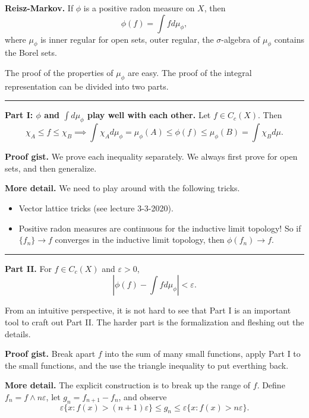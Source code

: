 \documentclass[12pt, letterpaper]{article}
\newcommand{\e}{\varepsilon}
\newcommand{\s}{\sigma}
\begin{document}
\pagestyle{fancy}
\textbf{Reisz-Markov.} If $\phi$ is a positive radon measure on $X$, then
\[
    \phi(f) = \int f d\mu_\phi,
\]
where $\mu_\phi$ is inner regular for open sets, outer regular, the $\s$-algebra of $\mu_\phi$ contains the Borel sets.

The proof of the properties of $\mu_\phi$ are easy. The proof of the integral representation can be divided into two parts.

\noindent\rule{\textwidth}{1pt}
\textbf{Part I: $\phi$ and $\int d\mu_\phi$ play well with each other.} Let $f \in C_c(X)$. Then
\[
    \chi_A \leq f \leq \chi_B \implies \int \chi_A d\mu_\phi = \mu_\phi(A) \leq \phi(f) \leq \mu_\phi(B) = \int \chi_B d\mu.
\]

\textbf{Proof gist.} We prove each inequality separately. We always first prove for open sets, and then generalize.

\textbf{More detail.} We need to play around with the following tricks.
\begin{itemize}
    \item Vector lattice tricks (see lecture 3-3-2020).
    \item Positive radon measures are continuous for the inductive limit topology! So if $\{f_n\} \rightarrow f$ converges in the inductive limit topology, then $\phi(f_n) \rightarrow f$.
\end{itemize}

\noindent\rule{\textwidth}{1pt}
\textbf{Part II.} For $f \in C_c(X)$ and $\e > 0$,
\[
    |\phi(f) - \int f d\mu_\phi| < \e.
\]

From an intuitive perspective, it is not hard to see that Part I is an important tool to craft out Part II. The harder part is the formalization and fleshing out the details.

\textbf{Proof gist.} Break apart $f$ into the sum of many small functions, apply Part I to the small functions, and the use the triangle inequality to put everthing back.

\textbf{More detail.} The explicit construction is to break up the range of $f$. Define $f_n = f \wedge n\e$, let $g_n = f_{n+1} - f_n$, and observe
\[
    \e \{x: f(x) > (n + 1)\e\} \leq g_n \leq \e \{x: f(x) > n\e\}.
\]
\end{document}
